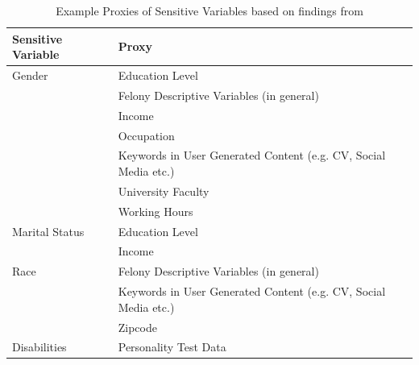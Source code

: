 \begin{table}[h]
    \scriptsize
    \centering
    \begin{tabularx}{0.8\textwidth}{p{}X}
        \toprule
        Sensitive Variable & Proxy \\%
        \midrule
        Gender &    Education Level \\
                    & Felony Descriptive Variables (in general) \\
                    & Income \\
                    & Occupation \\
                    & Keywords in User Generated Content (e.g. CV, Social Media etc.)\\
                    & University Faculty \\
                    & Working Hours \\ 
        \midrule
        Marital Status &    Education Level\\
                       &    Income \\
        \midrule
        Race &  Felony Descriptive Variables (in general) \\
            &   Keywords in User Generated Content (e.g. CV, Social Media etc.) \\
            &   Zipcode \\ 
        \midrule
        Disabilities & Personality Test Data \\ 
        \bottomrule        
    \end{tabularx}
    \caption{Example Proxies of Sensitive Variables based on findings from }
    \label{tbl:proxies}
\end{table}

